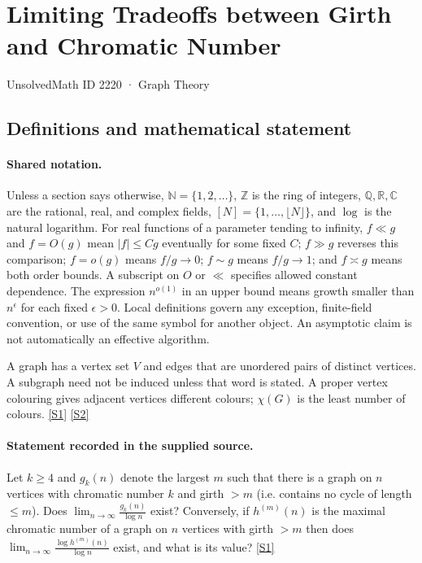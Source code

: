 \documentclass[11pt,a4paper]{article}
\newcommand{\N}{\mathbb{N}}
\newcommand{\Z}{\mathbb{Z}}
\newcommand{\Q}{\mathbb{Q}}
\newcommand{\R}{\mathbb{R}}
\newcommand{\C}{\mathbb{C}}
\newcommand{\sref}[2]{\hyperlink{source:#1:#2}{[S#2]}}
\begin{document}

\setcounter{section}{2219}

\section{Limiting Tradeoffs between Girth and Chromatic Number}\label{2220}

{\small\sffamily UnsolvedMath ID 2220 · Graph Theory}

\subsection{Definitions and mathematical statement}

\paragraph{Shared notation.}Unless a section says otherwise, $\N=\{1,2,\ldots\}$,
$\Z$ is the ring of integers, $\Q,\R,\C$ are the rational, real, and complex
fields, $[N]=\{1,\ldots,\lfloor N\rfloor\}$, and $\log$ is the natural
logarithm. For real functions of a parameter tending to infinity,
$f\ll g$ and $f=O(g)$ mean $|f|\leq Cg$ eventually for some fixed $C$;
$f\gg g$ reverses this comparison; $f=o(g)$ means $f/g\to0$;
$f\sim g$ means $f/g\to1$; and $f\asymp g$ means both order bounds.
A subscript on $O$ or $\ll$ specifies allowed constant dependence.
The expression $n^{o(1)}$ in an upper bound means growth smaller than
$n^\epsilon$ for each fixed $\epsilon>0$. Local definitions govern any
exception, finite-field convention, or use of the same symbol for another
object. An asymptotic claim is not automatically an effective algorithm.



A graph has a vertex set $V$ and edges that are unordered pairs of distinct vertices. A subgraph need not be induced unless that word is stated. A proper vertex colouring gives adjacent vertices different colours; $\chi(G)$ is the least number of colours. \sref{2220}{1} \sref{2220}{2}

\paragraph{Statement recorded in the supplied source.}
Let $k\geq 4$ and $g_k(n)$ denote the largest $m$ such that there is a graph on $n$ vertices with chromatic number $k$ and girth $>m$ (i.e. contains no cycle of length $\leq m$). Does $ \lim_{n\to \infty}\frac{g_k(n)}{\log n} $ exist?
Conversely, if $h^{(m)}(n)$ is the maximal chromatic number of a graph on $n$ vertices with girth $>m$ then does $ \lim_{n\to \infty}\frac{\log h^{(m)}(n)}{\log n} $ exist, and what is its value? \sref{2220}{1}
\end{document}
